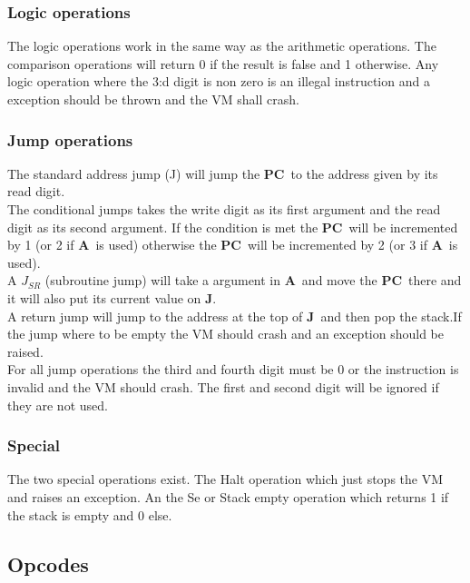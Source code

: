 \documentclass{article}
\newcommand{\A}{$\textbf{A}$}
\newcommand{\pc}{$\textbf{PC}$}
\newcommand{\J}{$\textbf{J}$}
\begin{document}
\subsubsection{Logic operations}
The logic operations work in the same way as the arithmetic operations. The
comparison operations will return 0 if the result is false and 1 otherwise.
Any logic operation where the 3:d digit is non zero is an illegal instruction
and a exception should be thrown and the VM shall crash.

\subsubsection{Jump operations}
The standard address jump (J) will jump the \pc \ to the address given by its
read digit.\\
The conditional jumps takes the write digit as its first argument and the read
digit as its second argument. If the condition is met the \pc \ will be
incremented by 1 (or 2 if \A \ is used) otherwise the \pc \ will be incremented
by 2 (or 3 if \A \ is used).\\
A $J_{SR}$ (subroutine jump) will take a argument in \A \ and move the \pc \
there and it will also put its current value on \J.\\
A return jump will jump to the address at the top of \J \ and then pop the
stack.If the jump where to be empty the VM should crash and an exception
should be raised.\\
For all jump operations the third and fourth digit must be 0 or the instruction
is invalid and the VM should crash. The first and second digit will be ignored
if they are not used.

\subsubsection{Special}
The two special operations exist. The Halt operation which just stops the VM and
raises an exception.
An the Se or Stack empty operation which returns 1 if the stack is empty and 0
else.

\subsection{Opcodes}
\end{document}
